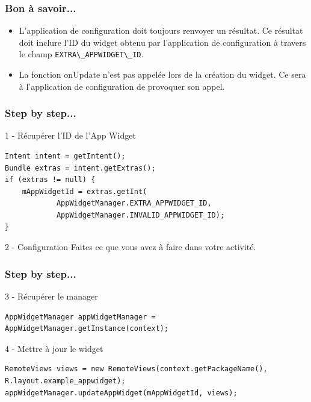 \documentclass{beamer}
\begin{document}
\begin{frame}
\frametitle{Bon à savoir...}
\begin{itemize}
\item L'application de configuration doit toujours renvoyer un résultat. Ce résultat doit inclure l'ID du widget obtenu par l'application de configuration à travers le champ \verb!EXTRA\_APPWIDGET\_ID!.
\item La fonction onUpdate n'est pas appelée lors de la création du widget. Ce sera à l'application de configuration de provoquer son appel.
\end{itemize}

\end{frame}

\begin{frame}[fragile]
\frametitle{Step by step...}

\begin{block}{1 - Récupérer l'ID de l'App Widget}
\begin{lstlisting}
Intent intent = getIntent();
Bundle extras = intent.getExtras();
if (extras != null) {
    mAppWidgetId = extras.getInt(
            AppWidgetManager.EXTRA_APPWIDGET_ID, 
            AppWidgetManager.INVALID_APPWIDGET_ID);
}
\end{lstlisting}
\end{block}

\begin{block}{2 - Configuration}
Faites ce que vous avez à faire dans votre activité.
\end{block}
\end{frame}

\begin{frame}[fragile]
\frametitle{Step by step...}

\begin{block}{3 - Récupérer le manager}
\begin{lstlisting}
AppWidgetManager appWidgetManager = AppWidgetManager.getInstance(context);
\end{lstlisting}
\end{block}

\begin{block}{4 - Mettre à jour le widget}
\begin{lstlisting}
RemoteViews views = new RemoteViews(context.getPackageName(),
R.layout.example_appwidget);
appWidgetManager.updateAppWidget(mAppWidgetId, views);
\end{lstlisting}
\end{block}

\end{frame}
\end{document}
